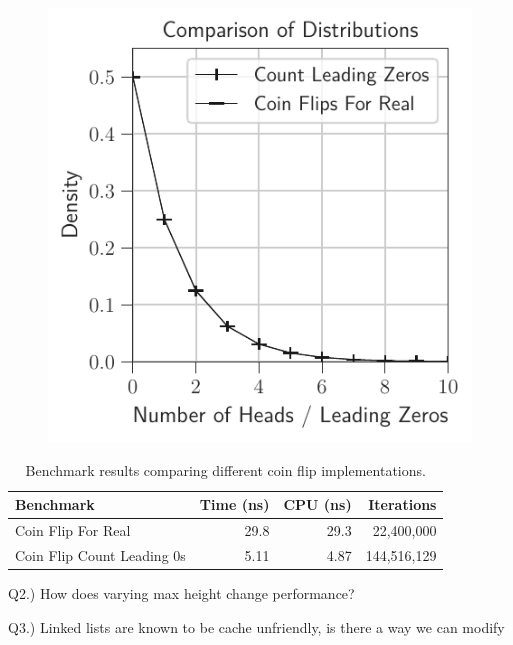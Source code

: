 \documentclass[12pt]{article}
\begin{document}
\begin{figure}[H]
\begin{minipage}{0.32\textwidth}
		\label{fig:coin_flips_count_leading}
	\end{minipage}\hfill
	\begin{minipage}{0.32\textwidth}
		\centering
		\includegraphics[width=\linewidth]{../notebook/comparison_of_distributions.pdf}
		\label{fig:coin_flips_comparison}
	\end{minipage}
\end{figure}


\begin{table}[h]
	\centering
	\small
	\begin{tabular}{lrrr}
		\hline
		\textbf{Benchmark} & \textbf{Time (ns)} & \textbf{CPU (ns)} & \textbf{Iterations} \\
		\hline
		Coin Flip For Real & 29.8 & 29.3 & 22,400,000 \\
		\hline
		Coin Flip Count Leading 0s & 5.11 & 4.87 & 144,516,129 \\
	\end{tabular}
	\caption{Benchmark results comparing different coin flip implementations.}
	\label{tab:benchmark_results}
\end{table}

Q2.) How does varying max height change performance?

Q3.) Linked lists are known to be cache unfriendly, is there a way we can modify 
\end{document}
